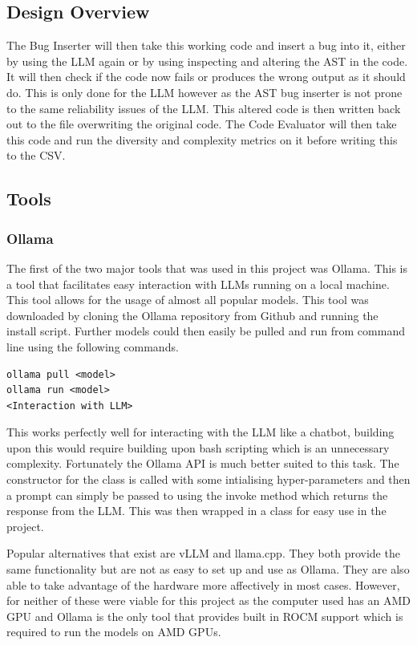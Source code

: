 \documentclass[12pt]{extarticle}
\begin{document}
\subsection{Design Overview}

The Bug Inserter will then take this working code and insert a bug into it, either by using the LLM again or by using inspecting and altering the AST in the code. It will then check if the code now fails or produces the wrong output as it should do. This is only done for the LLM however as the AST bug inserter is not prone to the same reliability issues of the LLM. This altered code is then written back out to the file overwriting the original code. The Code Evaluator will then take this code and run the diversity and complexity metrics on it before writing this to the CSV.

\subsection{Tools}
\subsubsection{Ollama}

The first of the two major tools that was used in this project was Ollama. This is a tool that facilitates easy interaction with LLMs running on a local machine. This tool allows for the usage of almost all popular models. This tool was downloaded by cloning the Ollama repository from Github and running the install script. Further models could then easily be pulled and run from command line using the following commands.

\begin{verbatim}
ollama pull <model>
ollama run <model>
<Interaction with LLM>
\end{verbatim}

This works perfectly well for interacting with the LLM like a chatbot, building upon this would require building upon bash scripting which is an unnecessary complexity. Fortunately the Ollama API is much better suited to this task. The constructor for the class is called with some intialising hyper-parameters and then a prompt can simply be passed to using the invoke method which returns the response from the LLM. This was then wrapped in a class for easy use in the project.

Popular alternatives that exist are vLLM and llama.cpp. They both provide the same functionality but are not as easy to set up and use as Ollama. They are also able to take advantage of the hardware more affectively in most cases. However, for neither of these were viable for this project as the computer used has an AMD GPU and Ollama is the only tool that provides built in ROCM support which is required to run the models on AMD GPUs. 
\end{document}
